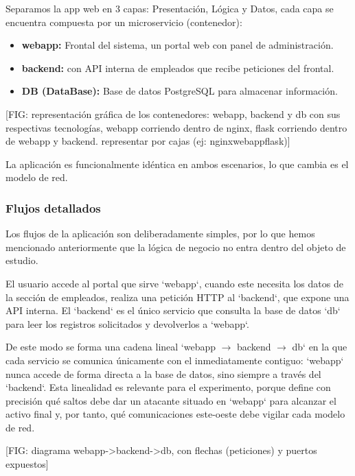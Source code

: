 \documentclass[11pt,spanish,listoffigures,listoftables]{tfgetsinf}
\begin{document}
        Separamos la app web en 3 capas: Presentación, Lógica y Datos, cada capa se encuentra compuesta por un microservicio (contenedor):
        \begin{itemize}
            \item \textbf{webapp:} Frontal del sistema, un portal web con panel de administración.
            \item \textbf{backend:} con API interna de empleados que recibe peticiones del frontal.
            \item \textbf{DB (DataBase):} Base de datos PostgreSQL para almacenar información.
        \end{itemize}

        [FIG: representación gráfica de los contenedores: webapp, backend y db con sus respectivas tecnologías, webapp corriendo dentro de nginx, flask corriendo dentro de webapp y backend. representar por cajas (ej: nginx{webapp{flask}})]

        La aplicación es funcionalmente idéntica en ambos escenarios, lo que cambia es el modelo de red.

        \subsubsection{Flujos detallados}
        \label{sec:4.1.1}
        Los flujos de la aplicación son deliberadamente simples, por lo que hemos mencionado anteriormente que la lógica de negocio no entra dentro del objeto de estudio. 
        
        El usuario accede al portal que sirve `webapp`, cuando este necesita los datos de la sección de empleados, realiza una petición HTTP al `backend`, que expone una API interna. El `backend` es el único servicio que consulta la base de datos `db` para leer los registros solicitados y devolverlos a `webapp`.

        De este modo se forma una cadena lineal `webapp $\rightarrow$ backend $\rightarrow$ db` en la que cada servicio se comunica únicamente con el inmediatamente contiguo: `webapp` nunca accede de forma directa a la base de datos, sino siempre a través del `backend`. Esta linealidad es relevante para el experimento, porque define con precisión qué saltos debe dar un atacante situado en `webapp` para alcanzar el activo final y, por tanto, qué comunicaciones este-oeste debe vigilar cada modelo de red.

        [FIG: diagrama webapp->backend->db, con flechas (peticiones) y puertos expuestos]
        
\end{document}

